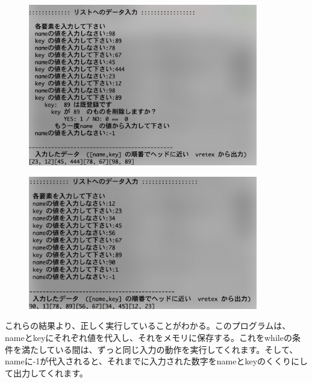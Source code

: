 \documentclass[a4paper,11pt,titlepage]{jarticle}
\begin{document}
\begin{figure}[htbp]
  \centering
  \includegraphics[width=100mm]{1358.png}
  \label{sample3}\\
\end{figure}

\begin{figure}[htbp]
  \centering
  \includegraphics[width=100mm]{1359.png}
  \label{sample4}\\
\end{figure}\par
\par

これらの結果より、正しく実行していることがわかる。このプログラムは、nameとkeyにそれぞれ値を代入し、それをメモリに保存する。これをwhileの条件を満たしている間は、ずっと同じ入力の動作を実行してくれます。そして、nameに-1が代入されると、それまでに入力された数字をnameとkeyのくくりにして出力してくれます。
\end{document}
